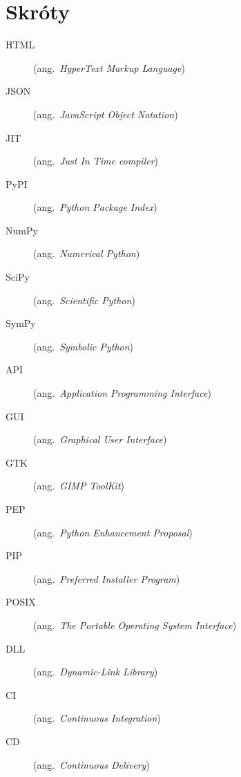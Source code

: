 \chapter*{Skróty}\mbox{}
\label{sec:skroty}
\noindent
\begin{description}
  \item [HTML]    (ang.\ \emph{HyperText Markup Language})
  \item [JSON]    (ang.\ \emph{JavaScript Object Notation})
  \item [JIT]     (ang.\ \emph{Just In Time compiler})
  \item [PyPI]    (ang.\ \emph{Python Package Index})
  \item [NumPy]   (ang.\ \emph{Numerical Python})
  \item [SciPy]   (ang.\ \emph{Scientific Python})
  \item [SymPy]   (ang.\ \emph{Symbolic Python})
  \item [API]     (ang.\ \emph{Application Programming Interface})
  \item [GUI]     (ang.\ \emph{Graphical User Interface})
  \item [GTK]     (ang.\ \emph{GIMP ToolKit})
  \item [PEP]     (ang.\ \emph{Python Enhancement Proposal})
  \item [PIP]     (ang.\ \emph{Preferred Installer Program})
  \item [POSIX]   (ang.\ \emph{The Portable Operating System Interface})
  \item [DLL]     (ang.\ \emph{Dynamic-Link Library})
  \item [CI] (ang.\ \emph{Continuous Integration})
  \item [CD] (ang.\ \emph{Continuous Delivery})
\end{description}
